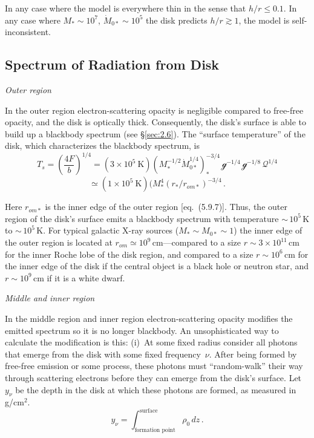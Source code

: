 In any case where the model
is everywhere thin in the sense that $h/r \leq 0.1$.  In any case where $M_* \sim 10^7$, $\dot{M}_{0*} \sim 10^5$ the disk
predicts $h/r \gtrsim 1$, the model is self-inconsistent.


\subsection{Spectrum of Radiation from Disk}
\label{sec:5.10}

\noindent
\textit{Outer region}

In the outer region electron-scattering opacity is negligible compared to free-free
opacity, and the disk is optically thick.  Consequently, the disk's surface
is able to build up a blackbody spectrum (see \S\ref{sec:2.6}).  The ``surface temperature''
of the disk, which characterizes the blackbody spectrum, is
%
\begin{equation}
\tag{5.10.1}
T_s = \left(\frac{4F}{b}\right)^{1/4}
= (3 \times 10^5~\text{K})(M_*^{-1/2}\dot{M}_{0*}^{1/4})_*^{-3/4}\,
\mathscr{g}^{-1/4}\,\mathscr{g}^{-1/8}\,\mathscr{Q}^{1/4}
\end{equation}
%
\[
\simeq (1 \times 10^5~\text{K})(M_*^{4}(r_*/r_{om*})^{-3/4}\,.
\]

Here $r_{om*}$ is the inner edge of the outer region [eq.\ (5.9.7)].  Thus, the outer
region of the disk's surface emits a blackbody spectrum with temperature
${\sim}\,10^5$\,K to ${\sim}\,10^5$\,K.  For typical galactic X-ray sources ($M_* \sim M_{0*} \sim 1$) the
inner edge of the outer region is located at $r_{om} \simeq 10^9$\,cm---compared to a size
$r \sim 3 \times 10^{11}$\,cm for the inner Roche lobe of the disk region, and compared to a size
$r \sim 10^6$\,cm for the inner edge of the disk if the central object is a black
hole or neutron star, and $r \sim 10^9$\,cm if it is a white dwarf.

\medskip
\noindent
\textit{Middle and inner region}

In the middle region and inner region electron-scattering opacity modifies the
emitted spectrum so it is no longer blackbody.  An unsophisticated way to calculate
the modification is this: (i)~At some fixed radius consider all photons that
emerge from the disk with some fixed frequency~$\nu$.  After being formed by free-free
emission or some process, these photons must ``random-walk'' their
way through scattering electrons before they can emerge from the disk's
surface.  Let $y_\nu$ be the depth in the disk at which these photons are formed, as
measured in g/cm$^2$.
%
\[
y_\nu = \int_{\text{formation point}}^{\text{surface}} \rho_0 \, dz\,.
\]

